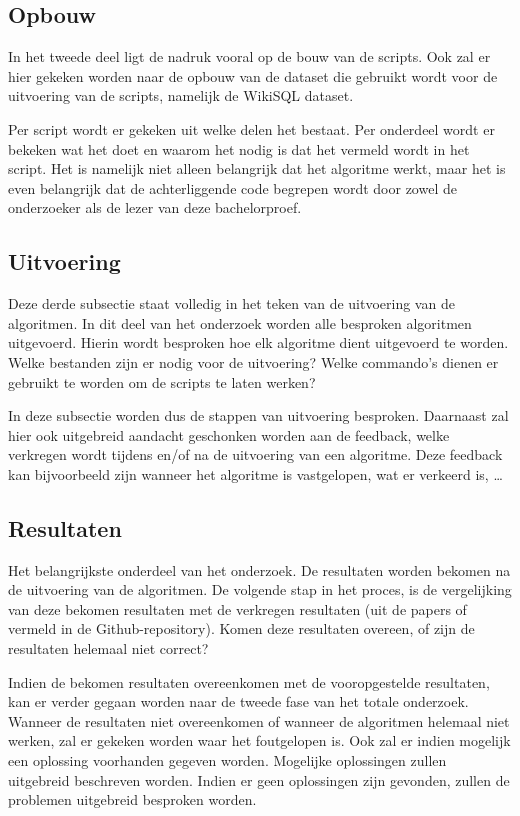 \subsection{Opbouw}

In het tweede deel ligt de nadruk vooral op de bouw van de scripts. Ook zal er hier gekeken worden naar de opbouw van de dataset die gebruikt wordt voor de uitvoering van de scripts, namelijk de WikiSQL dataset. 

Per script wordt er gekeken uit welke delen het bestaat. Per onderdeel wordt er bekeken wat het doet en waarom het nodig is dat het vermeld wordt in het script. Het is namelijk niet alleen belangrijk dat het algoritme werkt, maar het is even belangrijk dat de achterliggende code begrepen wordt door zowel de onderzoeker als de lezer van deze bachelorproef.

\subsection{Uitvoering}

Deze derde subsectie staat volledig in het teken van de uitvoering van de algoritmen. In dit deel van het onderzoek worden alle besproken algoritmen uitgevoerd. Hierin wordt besproken hoe elk algoritme dient uitgevoerd te worden. Welke bestanden zijn er nodig voor de uitvoering? Welke commando's dienen er gebruikt te worden om de scripts te laten werken? 

In deze subsectie worden dus de stappen van uitvoering besproken. Daarnaast zal hier ook uitgebreid aandacht geschonken worden aan de feedback, welke verkregen wordt tijdens en/of na de uitvoering van een algoritme. Deze feedback kan bijvoorbeeld zijn wanneer het algoritme is vastgelopen, wat er verkeerd is, \dots 

\subsection{Resultaten}

Het belangrijkste onderdeel van het onderzoek. De resultaten worden bekomen na de uitvoering van de algoritmen. De volgende stap in het proces, is de vergelijking van deze bekomen resultaten met de verkregen resultaten (uit de papers of vermeld in de Github-repository). Komen deze resultaten overeen, of zijn de resultaten helemaal niet correct? 

Indien de bekomen resultaten overeenkomen met de vooropgestelde resultaten, kan er verder gegaan worden naar de tweede fase van het totale onderzoek. Wanneer de resultaten niet overeenkomen of wanneer de algoritmen helemaal niet werken, zal er gekeken worden waar het foutgelopen is. Ook zal er indien mogelijk een oplossing voorhanden gegeven worden. Mogelijke oplossingen zullen uitgebreid beschreven worden. Indien er geen oplossingen zijn gevonden, zullen de problemen uitgebreid besproken worden.

